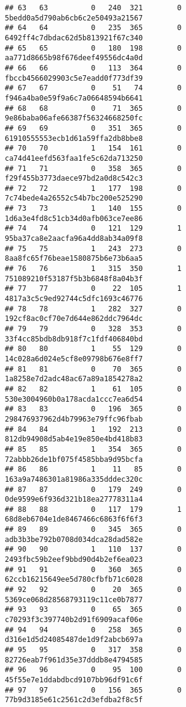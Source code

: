 \documentclass[
]{article}
\begin{document}
\begin{verbatim}
## 63   63          0   240  321        0 5bedd0a5d790ab6cb6c2e50493a21567
## 64   64          0   235  365        0 6492ff4c7dbdac62d5b813921f67c340
## 65   65          0   180  198        0 aa771d8665b98f676deef49556dc4a0d
## 66   66          0   113  364        0 fbccb4566029903c5e7eadd0f773df39
## 67   67          0    51   74        0 f946a4ba0e59f9a6c7a06648594b6641
## 68   68          0    71  365        0 9e86baba06afe66387f56324668250fc
## 69   69          0   351  365        0 61910555553ecb1d61a59ffa2db8bbe8
## 70   70          1   154  161        0 ca74d41eefd563faa1fe5c62da713250
## 71   71          0   358  365        0 f29f455b3773daece97bd2a0d8c542c3
## 72   72          1   177  198        0 7c74bede4a26552c54b7bc200e525290
## 73   73          1   140  155        0 1d6a3e4fd8c51cb34d0afb063ce7ee86
## 74   74          0   121  129        1 95ba37ca8e2aacfa96a4dd8ab34a09f8
## 75   75          1   243  273        0 8aa8fc65f76beae1580875b6e73b6aa5
## 76   76          1   315  350        1 751089210f53187f5b3b6848f8a04b3f
## 77   77          0    22  105        1 4817a3c5c9ed92744c5dfc1693c46776
## 78   78          1   282  327        0 192cf8ac0cf70e7d644e862ddc7964dc
## 79   79          0   328  353        0 33f4cc85bdb8db918f7c1fdf406840bd
## 80   80          1    55  129        0 14c028a6d024e5cf8e09798b676e8ff7
## 81   81          0    70  365        0 1a8258e7d2adc48ac67a89a1854278a2
## 82   82          1    61  105        0 530e3004960b0a178acda1ccc7ea6d54
## 83   83          0   196  365        0 298476937962d4b79963e79ffc96fbab
## 84   84          1   192  213        0 812db94908d5ab4e19e850e4bd418b83
## 85   85          1   354  365        0 72abbb26de1bf075f4585bba9d95bcfa
## 86   86          1    11   85        0 163a9a7486301a81986a335dddec320c
## 87   87          0   179  249        0 0de9599e6f936d321b18ea27778311a4
## 88   88          0   117  179        1 68d8eb6704e1de8467466c6863f6f6f3
## 89   89          0   345  365        0 adb3b3be792b0708d034dca28dad582e
## 90   90          1   110  137        0 2493fbc59b2eef9bbd90d4b2ef6ea023
## 91   91          0   360  365        0 62ccb16215649ee5d780cfbfb71c6028
## 92   92          0    20  365        0 5369ce068d28568793119c11ce0b7877
## 93   93          0    65  365        0 c70293f3c397740b2d91f6909acaf06e
## 94   94          0   258  365        0 d316e1d5d24085487de1d9f2abcb697a
## 95   95          0   317  358        0 82726eab7f961d35e37dddb8e4794585
## 96   96          0    95  100        0 45f55e7e1ddabdbcd9107bb96df91c6f
## 97   97          0   156  365        0 77b9d3185e61c2561c2d3efdba2f8c5f

\end{verbatim}
\end{document}
